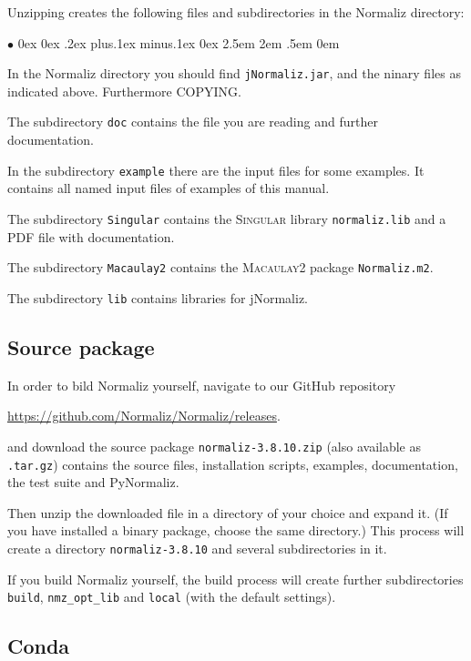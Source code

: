 \documentclass[12pt,a4paper]{scrartcl}
\newcommand{\stdli}{ \topsep0ex \partopsep0ex %
\parsep.2ex plus.1ex minus.1ex \itemsep0ex%
\leftmargin2.5em \labelwidth2em \labelsep.5em \rightmargin0em}%
\renewenvironment{itemize}{\begin{list}{{$\bullet$}}{\stdli}}{\end{list}}
\theoremstyle{definition}
\def\ttt{\texttt}
\def\version{3.8.10}
\def\NmzDir{normaliz-\version}
\begin{document}
Unzipping creates the following files and  subdirectories in the Normaliz directory:

\begin{itemize}
	\item In the Normaliz directory you should
	find \ttt{jNormaliz.jar}, and the ninary files as indicated above. Furthermore COPYING.
	
	\item The subdirectory \ttt{doc} contains the file you are reading 
	and further documentation.
	
	\item In the subdirectory \ttt{example} there are the input
	files for some examples. It contains all named
	input files of examples of this manual.
	
	\item The subdirectory \ttt{Singular} contains the
	\textsc{Singular} library \ttt{normaliz.lib} and a PDF file with
	documentation.
	
	\item The subdirectory \ttt{Macaulay2} contains the
	\textsc{Macaulay2} package \ttt{Normaliz.m2}.
	
	\item The subdirectory \ttt{lib} contains libraries for
	jNormaliz.
\end{itemize}

\subsection{Source package}
In order to bild Normaliz yourself, navigate to our GitHub repository
\begin{center}
	\url{https://github.com/Normaliz/Normaliz/releases}.
\end{center}
and download the
source package \ttt{\NmzDir.zip} (also available as \ttt{.tar.gz}) contains the source files, installation scripts, examples, documentation, the test suite  and PyNormaliz.

Then unzip the downloaded file in a directory of your choice and expand it. (If you have installed  a binary package, choose the same directory.) 
This process will create a directory \ttt{\NmzDir} and several subdirectories in it.

If you build Normaliz yourself,  the build process will create  further subdirectories \verb|build|,  \verb|nmz_opt_lib| and \verb|local| (with the default settings).

\subsection{Conda}
\end{document}
